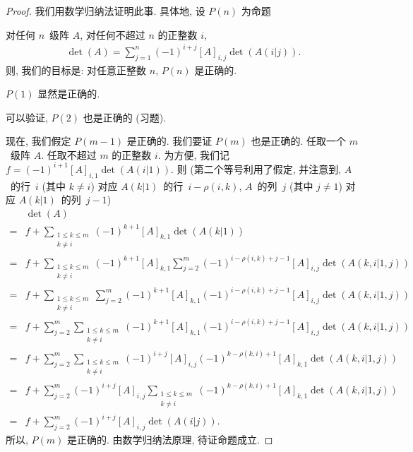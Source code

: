 \documentclass[%
    UTF8,%
    fontset=none,%
    punct=kaiming,%
    zihao=-4,%
    a4paper,%
    oneside,%
]{ctexbook}
\makeatletter
\renewcommand*{\leq}{\leqslant}
\renewenvironment{quotation}
{\list{}{\listparindent 2\ccwd%
\itemindent\listparindent
\leftmargin\rightmargin
\parsep\z@ \@plus\p@}%
\item\relax}
{\endlist}
\makeatother
\begin{document}
\begin{proof}
    我们用数学归纳法证明此事.
    具体地, 设 \(P(n)\) 为命题
    \begin{quotation}
        对任何 \(n\)~级阵 \(A\),
        对任何不超过 \(n\) 的正整数 \(i\),
        \begin{align*}
            \det {(A)} = \sum_{j = 1}^{n}
            {(-1)^{i+j} [A]_{i,j} \det {(A(i|j))}}.
        \end{align*}
    \end{quotation}
    则, 我们的目标是:
    对任意正整数 \(n\), \(P(n)\) 是正确的.

    \(P(1)\) 显然是正确的.

    可以验证, \(P(2)\) 也是正确的 (习题).

    现在, 我们假定 \(P(m-1)\) 是正确的.
    我们要证 \(P(m)\) 也是正确的.
    任取一个 \(m\)~级阵 \(A\).
    任取不超过 \(m\) 的正整数 \(i\).
    为方便, 我们记
    \(f = (-1)^{i+1} [A]_{i,1} \det {(A(i|1))}\).
    则 (第二个等号利用了假定,
    并注意到,
    \(A\)~的行~\(i\) (其中 \(k \neq i\)) 对应
    \(A(k|1)\)~的行~\(i - \rho(i,k)\),
    \(A\)~的列~\(j\) (其中 \(j \neq 1\)) 对应
    \(A(k|1)\)~的列~\(j - 1\))
    \begin{align*}
             & \det {(A)}
        \\
        = {} &
        f + \sum_{\substack{1 \leq k \leq m \\k \neq i}}
        {(-1)^{k+1} [A]_{k,1} \det {(A(k|1))}}
        \\
        = {} &
        f + \sum_{\substack{1 \leq k \leq m \\k \neq i}}
        {(-1)^{k+1} [A]_{k,1}
        \sum_{j = 2}^{m}
        {(-1)^{i - \rho(i,k) + j - 1}
            [A]_{i,j} \det {(A(k,i|1,j))}}}
        \\
        = {} &
        f + \sum_{\substack{1 \leq k \leq m \\k \neq i}}
        {\sum_{j = 2}^{m}
        {(-1)^{k+1} [A]_{k,1}
        (-1)^{i - \rho(i,k) + j - 1}
            [A]_{i,j} \det {(A(k,i|1,j))}}}
        \\
        = {} &
        f + \sum_{j = 2}^{m}
        {\sum_{\substack{1 \leq k \leq m    \\k \neq i}}
        {(-1)^{k+1} [A]_{k,1}
            (-1)^{i - \rho(i,k) + j - 1}
                [A]_{i,j} \det {(A(k,i|1,j))}}}
        \\
        = {} &
        f + \sum_{j = 2}^{m}
        {\sum_{\substack{1 \leq k \leq m    \\k \neq i}}
        {(-1)^{i+j} [A]_{i,j}
            (-1)^{k - \rho(k,i) + 1}
                [A]_{k,1} \det {(A(k,i|1,j))}}}
        \\
        = {} &
        f + \sum_{j = 2}^{m}
        {(-1)^{i+j} [A]_{i,j}
        \sum_{\substack{1 \leq k \leq m     \\k \neq i}}
        {(-1)^{k - \rho(k,i) + 1}
                [A]_{k,1} \det {(A(k,i|1,j))}}}
        \\
        = {} &
        f + \sum_{j = 2}^{m}
        {(-1)^{i+j} [A]_{i,j} \det {(A(i|j))}}.
    \end{align*}
    所以, \(P(m)\) 是正确的.
    由数学归纳法原理, 待证命题成立.
\end{proof}
\end{document}
